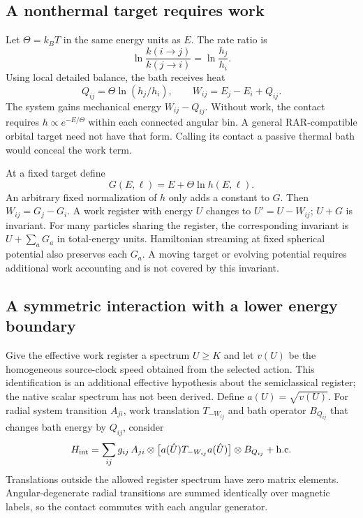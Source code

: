 \documentclass[11pt]{article}
\begin{document}
\subsection{A nonthermal target requires work}
Let $\Theta=k_BT$ in the same energy units as $E$. The rate ratio is
\begin{equation}
 \ln\frac{k(i\to j)}{k(j\to i)}=\ln\frac{h_j}{h_i}.
\end{equation}
Using local detailed balance\cite{Seifert}, the bath receives heat
\begin{equation}\label{eq:heat}
 Q_{ij}=\Theta\ln(h_j/h_i),\qquad
 W_{ij}=E_j-E_i+Q_{ij}.
\end{equation}
The system gains mechanical energy $W_{ij}-Q_{ij}$.
Without work, the contact requires $h\propto e^{-E/\Theta}$ within each
connected angular bin. A general RAR-compatible orbital target need not
have that form. Calling its contact a passive thermal bath would conceal
the work term.

At a fixed target define
\begin{equation}
 G(E,\boldsymbol\ell)=E+\Theta\ln h(E,\boldsymbol\ell).
\end{equation}
An arbitrary fixed normalization of $h$ only adds a constant to $G$.
Then $W_{ij}=G_j-G_i$. A work register with energy $U$ changes to
$U'=U-W_{ij}$; $U+G$ is invariant. For many particles sharing the register,
the corresponding invariant is $U+\sum_aG_a$ in total-energy units.
Hamiltonian streaming at fixed spherical potential also preserves each
$G_a$. A moving target or evolving potential requires additional work
accounting and is not covered by this invariant.

\subsection{A symmetric interaction with a lower energy boundary}
Give the effective work register a spectrum $U\ge K$ and let $v(U)$ be
the homogeneous source-clock speed obtained from the selected action.
This identification is an additional effective hypothesis about the
semiclassical register; the native scalar spectrum has not been derived.
Define $a(U)=\sqrt{v(U)}$. For radial system transition $A_{ji}$, work
translation $T_{-W_{ij}}$ and bath operator $B_{Q_{ij}}$ that changes bath
energy by $Q_{ij}$, consider
\begin{equation}\label{eq:Hint}
 H_{\rm int}=\sum_{ij}g_{ij}\,
 A_{ji}\otimes\bigl[a(\hat U)T_{-W_{ij}}a(\hat U)\bigr]
 \otimes B_{Q_{ij}}+\text{h.c.}
\end{equation}
Translations outside the allowed register spectrum have zero matrix
elements. Angular-degenerate radial transitions are summed identically
over magnetic labels, so the contact commutes with each angular generator.
\end{document}
